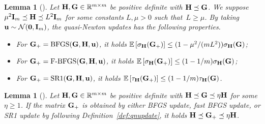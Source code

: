 \documentclass[11pt]{article}
\theoremstyle{plain}
\newtheorem{lemma}[theorem]{Lemma}
\theoremstyle{definition}
\theoremstyle{remark}
\newtheorem{remark}[theorem]{Remark}
\theoremstyle{plain}
\def\vzero{{\bf{0}}}
\def\vu{{\bf{u}}}
\def\fN{{\mathcal{N}}}
\def\mI {{\bf I}}
\def\G{{\bf G}}
\def\H{{\bf H}}
\def\I{{\bf I}}
\def\u{{\bf u}}
\def\RB{{\mathbb R}}
\def\EB{{\mathbb E}}
\def \EBP #1{\EB\left[#1\right]}
\def \srk{{\text{\rm SR1}}}
\def \bfgs{{\text{\rm BFGS}}}
\def \fbfgs{{\text{\rm F-BFGS}}}
\begin{document}
\begin{lemma}[{\citet[Theorems~6, 13, and~14]{lin2022explicit}}]
\label{lm:QN_one_iter}
    Let $\H,\G\in\RB^{m\times m}$ be positive definite with $\H\preceq\G$. We suppose $\mu^2\I_m\preceq\H\preceq L^2\I_m$ for some constants $L,\mu>0$ such that~$L\geq\mu$. By taking $\vu\sim\fN(\vzero,\mI_m)$, the quasi-Newton updates has the following properties.
\begin{itemize}
\item For $\G_{+}=\bfgs(\G,\H,\u)$, it holds  $\EBP{\sigma_{\H}(\G_{+})}\leq(1-\mu^2/(mL^2))\sigma_{\H}(\G)$;
\item For $\G_{+}=\fbfgs(\G,\H,\u)$, it holds  $\EBP{\sigma_{\H}(\G_{+})}\leq(1-1/m)\sigma_{\H}(\G)$;
\item For $\G_{+}=\srk(\G,\H,\u)$, it holds  $\EBP{\tau_{\H}(\G_{+})}\leq(1-1/m)\tau_{\H}(\G)$.
\end{itemize}
\end{lemma}

\begin{lemma}[{\citet[Lemma~5]{lin2022explicit}}]
\label{lm:QN_order}
    Let $\H,\G\in\RB^{m\times m}$ be positive definite with $\H\preceq\G\preceq\eta\H$ for some $\eta\geq1$. If the matrix $\G_{+}$ is obtained by either BFGS update, fast BFGS update, or SR1 update by following Definition~\ref{def:qnupdate}, it holds $\H\preceq\G_{+}\preceq\eta\H$.
\end{lemma}



\end{document}
